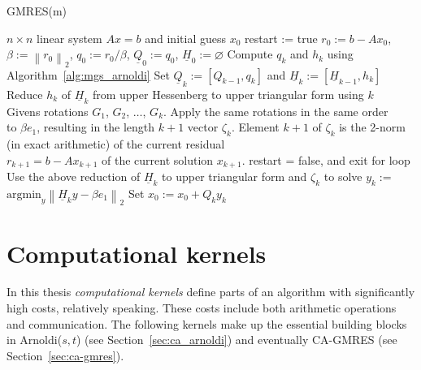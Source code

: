 \documentclass{scrartcl}
\numberwithin{equation}{section}
\newcommand{\norm}[1]{\left\lVert#1\right\rVert}
\begin{document}
\begin{algorithm}
\caption{GMRES(m)}
\label{alg:gmres(m)}
\begin{algorithmic}[1]
    \REQUIRE $n \times n$ linear system $Ax = b$ and initial guess $x_0$
    \STATE restart := true
    	\STATE $r_0:=b - Ax_0$, $\beta := \norm{r_0}_2$, $q_0 := r_0/\beta$, $\underline{Q}_0 := q_0$, $\underline{H}_0 := \varnothing$
			\STATE Compute $q_k$ and $h_k$ using Algorithm~\ref{alg:mgs_arnoldi}
			\STATE Set $\underline{Q}_k := [Q_{k-1},q_k]$ and $\underline{H}_k := [\underline{H}_{k -1}, h_k]$
			\STATE Reduce ${h_k}$ of $\underline{H}_k$ from upper Hessenberg to upper triangular form using $k$ \\
		\hspace{\algorithmicindent} Givens rotations $G_1$, $G_2$, $ \ldots$, $G_{k}$. Apply the same rotations in the same order \\ 
		\hspace{\algorithmicindent} to $\beta e_1$,  resulting in the length $k + 1$ vector $\zeta_{k}$.
			\STATE Element $k + 1$ of $\zeta_k$ is the 2-norm (in exact arithmetic) of the current residual \\
\hspace{\algorithmicindent} $r_{k + 1} = b - Ax_{k + 1}$ of the current solution $x_{k + 1}$.
			\STATE restart = false, and exit for loop		
		\ENDIF
		\ENDFOR
		\STATE Use the above reduction of $\underline{H}_k$ to upper triangular form and $\zeta_k$ to solve $y_k :=$ \\ \hspace{\algorithmicindent} $\text{argmin}_{y} \norm{\underline{H}_k y - \beta e_1}_2$
		\STATE Set $x_0 := x_0 + Q_k y_k$
	\ENDWHILE 
\end{algorithmic}
\end{algorithm}

\section{Computational kernels}
In this thesis \textit{computational kernels} define parts of an algorithm with significantly high costs, relatively speaking. These costs include both arithmetic operations and communication. The following kernels make up the essential building blocks in Arnoldi($s,t$) (see Section~\ref{sec:ca_arnoldi}) and eventually CA-GMRES (see Section~\ref{sec:ca-gmres}).
\end{document}
